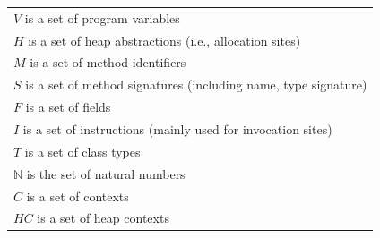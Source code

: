 \begin{figure}[tb!p]
\hspace{-1mm}
\begin{tabular}{l}
\small $V$ is a set of program variables \\
\small $H$ is a set of heap abstractions (i.e., allocation sites) \\
\small $M$ is a set of method identifiers \\
\small $S$ is a set of method signatures (including name, type signature) \\
\small $F$ is a set of fields \\
\small $I$ is a set of instructions (mainly used for invocation sites)\\
\small $T$ is a set of class types \\
\small $\mathbb{N}$ is the set of natural numbers \\
\small $C$ is a set of contexts \\
\small $HC$ is a set of heap contexts \\
\cline{1-1}

\end{tabular}
\end{figure}
